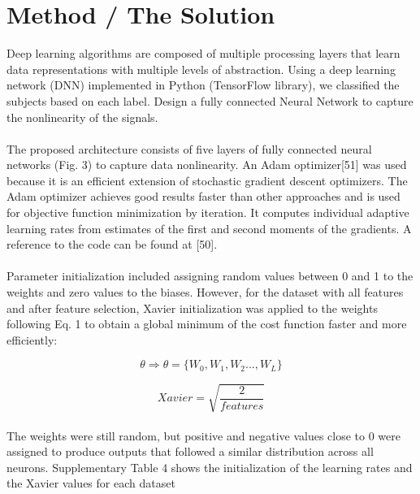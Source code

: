 \documentclass{llncs}       %
\begin{document}
\paragraph{}

\section{Method / The Solution}
\label{sec:3}
Deep learning algorithms are composed of multiple processing layers that learn data representations with multiple levels of abstraction. Using a deep learning network (DNN) implemented in Python (TensorFlow library), we classified the subjects based on each label.  Design a fully connected Neural Network to capture the nonlinearity of the signals.
 
\paragraph{}
The proposed architecture consists of five layers of fully connected neural networks (Fig. 3) to capture data nonlinearity. An Adam optimizer[51] was used because it is an efficient extension of stochastic gradient descent optimizers. The Adam optimizer achieves good results faster than other approaches and is used for objective function minimization by iteration. It computes individual adaptive learning rates from estimates of the first and second moments of the gradients.  A reference to the code can be found at [50]. 

\paragraph{}
Parameter initialization included assigning random values between 0 and 1 to the weights and zero values to the biases. However, for the dataset with all features and after feature selection, Xavier initialization was applied to the weights following Eq. 1 to obtain a global minimum of the cost function faster and more efficiently: 

\begin{equation} 
\theta\Rightarrow\theta=\{W_{0},W_{1},W_{2}...,W_{L}\}
\end{equation}

\begin{equation} 
Xavier = \sqrt{\frac{2}{features}}
\end{equation}

\paragraph{}
The weights were still random, but positive and negative values close to 0 were assigned to produce outputs that followed a similar distribution across all neurons. Supplementary Table 4 shows the initialization of the learning rates and the Xavier values for each dataset
\end{document}

